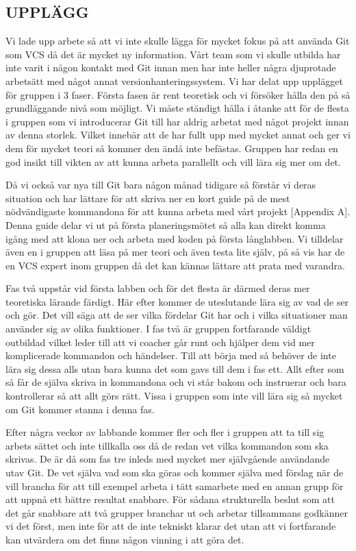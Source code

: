 \subsection{UPPLÄGG}
\label{Upplagg}
Vi lade upp arbete så att vi inte skulle lägga för mycket fokus på att använda Git som VCS då det är mycket ny information. Vårt team som vi skulle utbilda har inte varit i någon kontakt med Git innan men har inte heller några djuprotade arbetsätt med något annat versionhanteringssystem. Vi har delat upp upplägget för gruppen i 3 faser. Första fasen är rent teoretisk och vi försöker hålla den på så grundläggande nivå som möjligt. Vi måste ständigt hålla i åtanke att för de flesta i gruppen som vi introducerar Git till har aldrig arbetat med något projekt innan av denna storlek. Vilket innebär att de har fullt upp med mycket annat och ger vi dem för mycket teori så kommer den ändå inte befästas. Gruppen har redan en god insikt till vikten av att kunna arbeta parallellt och vill lära sig mer om det. 

Då vi också var nya till Git bara någon månad tidigare så förstår vi deras situation och har lättare för att skriva ner en kort guide på de mest nödvändigaste kommandona för att kunna arbeta med vårt projekt [Appendix A]. Denna guide delar vi ut på första planeringsmötet så alla kan direkt komma igång med att klona ner och arbeta med koden på första långlabben. Vi tilldelar även en i gruppen att läsa på mer teori och även testa lite själv, på så vis har de en VCS expert inom gruppen då det kan kännas lättare att prata med varandra.
 
Fas två uppstår vid första labben och för det flesta är därmed deras mer teoretiska lärande färdigt. Här efter kommer de uteslutande lära sig av vad de ser och gör. Det vill säga att de ser vilka fördelar Git har och i vilka situationer man använder sig av olika funktioner. I fas två är gruppen fortfarande väldigt outbildad vilket leder till att vi coacher går runt och hjälper dem vid mer komplicerade kommandon och händelser. Till att börja med så behöver de inte lära sig dessa alls utan bara kunna det som gavs till dem i fas ett. Allt efter som så får de själva skriva in kommandona och vi står bakom och instruerar och bara kontrollerar så att allt görs rätt. Vissa i gruppen som inte vill lära sig så mycket om Git kommer stanna i denna fas.

Efter några veckor av labbande kommer fler och fler i gruppen att ta till sig arbets sättet och inte tillkalla oss då de redan vet vilka kommandon som ska skrivas. De är då som fas tre inleds med mycket mer självgående användande utav Git. De vet själva vad som ska göras och kommer själva med förslag när de vill brancha för att till exempel arbeta i tätt samarbete med en annan grupp för att uppnå ett bättre resultat snabbare. För sådana strukturella beslut som att det går snabbare att två grupper branchar ut och arbetar tillsammans godkänner vi det först, men inte för att de inte tekniskt klarar det utan att vi fortfarande kan utvärdera om det finns någon vinning i att göra det.

